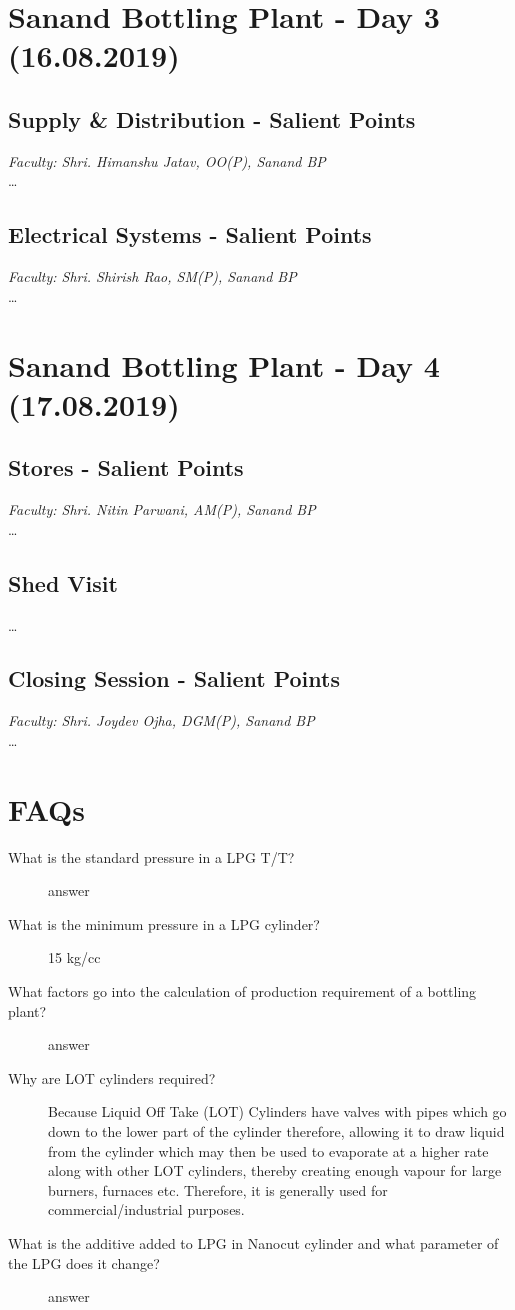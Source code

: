 \documentclass{report}
\begin{document}
	\section{Sanand Bottling Plant - Day 3 (16.08.2019)}
	
	\subsection{Supply \& Distribution - Salient Points}
	\textit{Faculty: Shri. Himanshu Jatav, OO(P), Sanand BP}\\
	\ldots
	
	\subsection{Electrical Systems - Salient Points}
	\textit{Faculty: Shri. Shirish Rao, SM(P), Sanand BP}\\
	\ldots
	
	\section{Sanand Bottling Plant - Day 4 (17.08.2019)}
	\subsection{Stores - Salient Points}
	\textit{Faculty: Shri. Nitin Parwani, AM(P), Sanand BP}\\
	\ldots
	
	\subsection{Shed Visit}
	\ldots
	
	\subsection{Closing Session - Salient Points}
	\textit{Faculty: Shri. Joydev Ojha, DGM(P), Sanand BP}\\
	\ldots
	
	\section{FAQs}
	\begin{description}
		\item[What is the standard pressure in a LPG T/T?] answer
		\item[What is the minimum pressure in a LPG cylinder?] 15 kg/cc
		\item[What factors go into the calculation of production requirement of a bottling plant?] answer
		\item[Why are LOT cylinders required?] Because Liquid Off Take (LOT) Cylinders have valves with pipes which go down to the lower part of the cylinder therefore, allowing it to draw liquid from the cylinder which may then be used to evaporate at a higher rate along with other LOT cylinders, thereby creating enough vapour for large burners, furnaces etc. Therefore, it is generally used for commercial/industrial purposes.
		\item[What is the additive added to LPG in Nanocut cylinder and what parameter of the LPG does it change?] answer
	\end{description}
\end{document}
